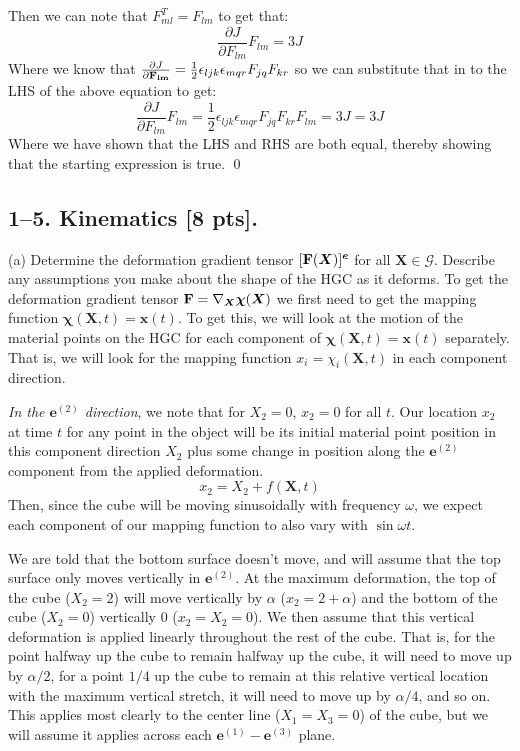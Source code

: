 Then we can note that $F^T_{ml}=F_{lm}$ to get that:
\begin{equation}
    \frac{\partial J}{\partial F_{lm}}F_{lm} = 3J
\end{equation}
Where we know that $\frac{\partial J}{\partial \mathbf{F_{lm}}} = \frac{1}{2}\epsilon_{ljk}\epsilon_{mqr}F_{jq}F_{kr}$ so we can substitute that in to the LHS of the above equation to get:
\begin{equation}
    \frac{\partial J}{\partial F_{lm}}F_{lm} = \frac{1}{2}\epsilon_{ljk}\epsilon_{mqr}F_{jq}F_{kr}F_{lm} = 3J =3J
\end{equation}
Where we have shown that the LHS and RHS are both equal, thereby showing that the starting expression is true. \qed

\newpage
\subsection*{1--5. \textbf{Kinematics} [8 pts].}

\medskip
(a) Determine the deformation gradient tensor $[\mathbf{F}(\bm{X})]^{\bm{e}}$ for all $\bm{X}\in \mathcal{G}$. Describe any assumptions you make about the shape of the HGC as it deforms. \newline
To get the deformation gradient tensor $\mathbf{F} = \nabla_{\bm{X}} \space \bm{\chi}(\bm{X})$ we first need to get the mapping function $\bm{\chi}(\bm{X},t) = \bm{x}(t)$. To get this, we will look at the motion of the material points on the HGC for each component of $\bm{\chi}(\bm{X},t)= \bm{x}(t)$ separately. That is, we will look for the mapping function $x_i = \chi_i(\bm{X},t)$ in each component direction.

\emph{In the $\bm{e}^{(2)}$ direction}, we note that for $X_2 = 0$, $x_2=0$ for all $t$.  Our location $x_2$ at time $t$ for any point in the object will be its initial material point position in this component direction $X_2$ plus some change in position along the $\bm{e}^{(2)}$ component from the applied deformation. 
\begin{equation}
    x_2 = X_2 + f(\bm{X},t)
\end{equation}
Then, since the cube will be moving sinusoidally with frequency $\omega$, we expect each component of our mapping function to also vary with $\sin{\omega t}$.

We are told that the bottom surface doesn't move, and will assume that the top surface only moves vertically in $\bm{e}^{(2)}$. At the maximum deformation, the top of the cube ($X_2 = 2$) will move vertically by $\alpha$ ($x_2 = 2 + \alpha$) and the bottom of the cube ($X_2 = 0$) vertically $0$ ($x_2 = X_2 = 0$). We then assume that this vertical deformation is applied linearly throughout the rest of the cube. That is, for the point halfway up the cube to remain halfway up the cube, it will need to move up by $\alpha / 2$, for a point $1/4$ up the cube to remain at this relative vertical location with the maximum vertical stretch, it will need to move up by $\alpha / 4$, and so on. This applies most clearly to the center line ($X_1 = X_3 = 0$) of the cube, but we will assume it applies across each $\bm{e}^{(1)}-\bm{e}^{(3)}$ plane.

